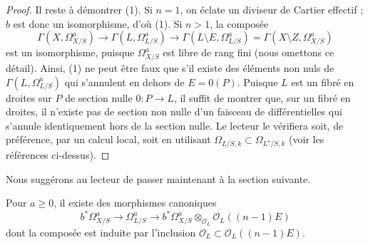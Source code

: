\begin{proof}
\medskip\noindent
Il reste à démontrer (1). Si $n = 1$, on éclate
un diviseur de Cartier effectif ; $b$ est donc un isomorphisme,
d'où (1). Si $n > 1$, la composée
$$
\Gamma(X, \Omega^a_{X/S})
\to
\Gamma(L, \Omega^a_{L/S})
\to
\Gamma(L \setminus E, \Omega^a_{L/S})
=
\Gamma(X \setminus Z, \Omega^a_{X/S})
$$
est un isomorphisme, puisque $\Omega^a_{X/S}$ est libre de rang fini
(nous omettons ce détail). Ainsi, (1) ne peut être faux que s'il
existe des éléments non nuls de $\Gamma(L, \Omega^a_{L/S})$ qui s'annulent
en dehors de $E = 0(P)$. Puisque $L$ est un fibré en droites sur $P$
de section nulle $0 : P \to L$, il suffit de montrer que,
sur un fibré en droites, il n'existe pas de section non nulle d'un faisceau
de différentielles qui s'annule identiquement hors de la section nulle.
Le lecteur le vérifiera soit, de préférence, par un calcul local,
soit en utilisant $\Omega_{L/S, k} \subset \Omega_{L^\star/S, k}$
(voir les références ci-dessus).
\end{proof}

\noindent
Nous suggérons au lecteur de passer maintenant à la section suivante.

\begin{lemma}
\label{lemma-comparison-bis}
Pour $a \geq 0$, il existe des morphismes canoniques
$$
b^*\Omega^a_{X/S} \longrightarrow
\Omega^a_{L/S} \longrightarrow
b^*\Omega^a_{X/S} \otimes_{\mathcal{O}_L} \mathcal{O}_L((n - 1)E)
$$
dont la composée est induite par l'inclusion
$\mathcal{O}_L \subset \mathcal{O}_L((n - 1)E)$.
\end{lemma}

